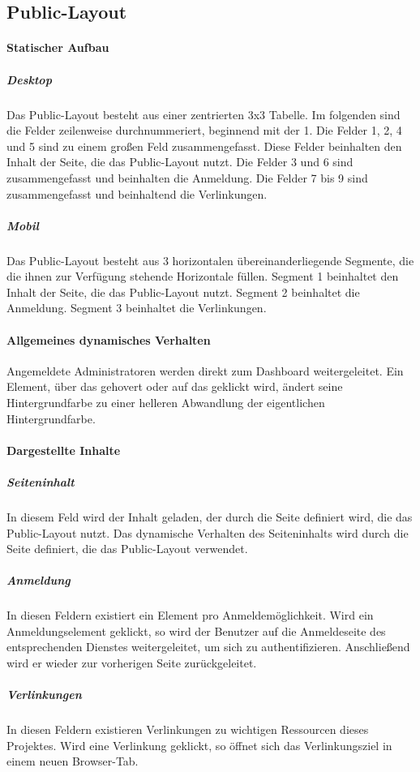 \subsection{Public-Layout}\label{AP_Public-Layout}

\paragraph*{Statischer Aufbau}
\subparagraph*{Desktop}
Das Public-Layout besteht aus einer zentrierten 3x3 Tabelle.
Im folgenden sind die Felder zeilenweise durchnummeriert, beginnend mit der 1.
Die Felder 1, 2, 4 und 5 sind zu einem großen Feld zusammengefasst. Diese Felder beinhalten den Inhalt der Seite, die das Public-Layout nutzt. 
Die Felder 3 und 6 sind zusammengefasst und beinhalten die Anmeldung.
Die Felder 7 bis 9 sind zusammengefasst und beinhaltend die Verlinkungen.

\subparagraph*{Mobil}
Das Public-Layout besteht aus 3 horizontalen übereinanderliegende Segmente, die die ihnen zur Verfügung stehende Horizontale füllen.
Segment 1 beinhaltet den Inhalt der Seite, die das Public-Layout nutzt. 
Segment 2 beinhaltet die Anmeldung.
Segment 3 beinhaltet die Verlinkungen.

\paragraph*{Allgemeines dynamisches Verhalten}
Angemeldete Administratoren werden direkt zum Dashboard weitergeleitet.
Ein Element, über das gehovert oder auf das geklickt wird, ändert seine Hintergrundfarbe zu einer helleren Abwandlung der eigentlichen Hintergrundfarbe.

\paragraph*{Dargestellte Inhalte}
\subparagraph*{Seiteninhalt}
In diesem Feld wird der Inhalt geladen, der durch die Seite definiert wird, die das Public-Layout nutzt.
Das dynamische Verhalten des Seiteninhalts wird durch die Seite definiert, die das Public-Layout verwendet.

\subparagraph*{Anmeldung}
In diesen Feldern existiert ein Element pro Anmeldemöglichkeit.
Wird ein Anmeldungselement geklickt, so wird der Benutzer auf die Anmeldeseite des entsprechenden Dienstes weitergeleitet, um sich zu authentifizieren.
Anschließend wird er wieder zur vorherigen Seite zurückgeleitet.

\subparagraph*{Verlinkungen}
In diesen Feldern existieren Verlinkungen zu wichtigen Ressourcen dieses Projektes.
Wird eine Verlinkung geklickt, so öffnet sich das Verlinkungsziel in einem neuen Browser-Tab.

